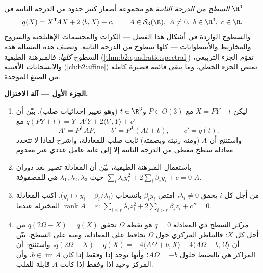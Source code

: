 \begin{problem}\label{pb:b2:surfaces:1}
\emph{السطح من الدرجة الثانية} هو
مجموعة أصفار كثير حدود من الدرجة الثانية في $\R^3$
\[
q(X) = X^{\mathsf T}\!AX + 2\,\langle b, X\rangle + c,
\qquad A \in \mathcal S_3(\R),\ A \neq 0,\ b \in \R^3,\
c \in \R .
\]
والسطوح الواردة في أشكال هذا الفصل --- الكرات والمجسمات الإهليلجية
والسروج والمخاريط والأسطوانات --- كلها سطوح من الدرجة الثانية. وتصنف
هذه المسألة هذه السطوح \emph{كلها}: فالمبرهنة الطيفية (\cref{thm:b2:quadratic:spectral})
تقوّم الجزء التربيعي، والانسحابات الأفينية (\cref{ch:b2:affine}) تمتص الجزء
الخطي، وما يبقى قائمة قصيرة كاملة من الصيغ الموحدة.

\medskip
\noindent\textbf{الجزء الأول --- آلة الاختزال.}
\begin{enumerate}
  \item ليكن $X = PY + t$ مع $P \in O(3)$ و$t \in \R^3$ (وهو تغيير إحداثيات صلب).
        بيّن أن $q(PY + t) =
        Y^{\mathsf T}\!A'Y + 2\langle b', Y\rangle + c'$ مع
        \[
        A' = P^{\mathsf T}\!AP, \qquad
        b' = P^{\mathsf T}(At + b), \qquad
        c' = q(t) .
        \]
        واستنتج أن  $A$ (ومنه رتبته وبصمته) ثابت صلب للمعادلة،
        واشرح لماذا لا تتحدد معادلة سطح معطى من الدرجة الثانية إلا
        إلى غاية عامل عددي غير معدوم.
  \item باستعمال المبرهنة الطيفية، بيّن أن المعادلة تصير بعد دوران
        $\sum_i \lambda_i y_i^2 +
        2\sum_i\beta_iy_i + c = 0$ حيث $\lambda_1, \lambda_2,
        \lambda_3$ هي  للمصفوفة $A$.
  \item من أجل كل $i$ يحقق $\lambda_i \neq 0$، امتص $\beta_iy_i$ بانسحاب ($y_i \mapsto y_i -
        \beta_i/\lambda_i$).
        اكتب المعادلة المختزلة عندما $\operatorname{rank} A = r$: $\sum_{i\leq r}\lambda_i
        z_i^2 + 2\sum_{i > r}\beta_iz_i + c'' = 0$.
  \item \emph{مركز} السطح ذي المعادلة $q = 0$ هو نقطة $\Omega$ تحقق
        $q(2\Omega - X) = q(X)$ من أجل كل $X$: فالتناظر المركزي حول $\Omega$ يحافظ
        على المعادلة، ومنه على السطح. بيّن أن $q(2\Omega - X)
        - q(X) = -4\langle A\Omega + b, X\rangle + 4\langle
        A\Omega + b, \Omega\rangle$، واستنتج: أن
        المراكز هي بالضبط حلول $A\Omega = -b$؛ وأنها توجد إذا وفقط إذا كان
        $b \in \operatorname{im}A$، وأن المركز وحيد إذا وفقط إذا كانت $A$ قابلة
        للقلب.
\end{enumerate}


\end{problem}
